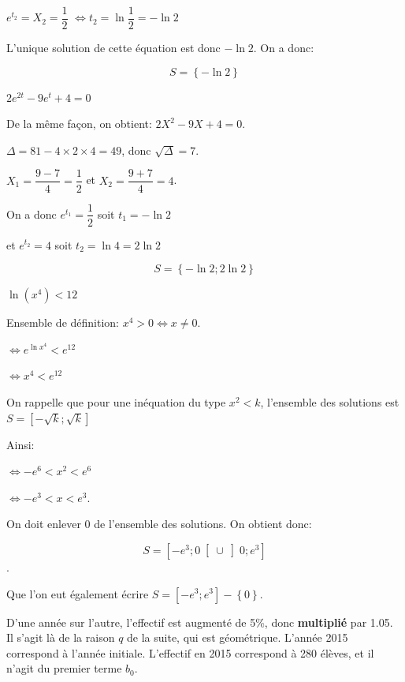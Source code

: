\documentclass[a4paper,12pt]{scrartcl}
\begin{document}

$e^{t_2} = X_2 = \dfrac{1}{2}$
$\Leftrightarrow t_2 = \ln \dfrac{1}{2} = - \ln 2$

L'unique solution  de cette équation est donc $- \ln 2$. On a donc:

$$S = \left\lbrace - \ln 2 \right\rbrace$$

\question{}
$2e^{2t} - 9e^t + 4 = 0$

De la même façon, on obtient: $2X^2 - 9X + 4 = 0$.

$\Delta = 81 - 4 \times 2 \times  4 = 49$, donc $\sqrt{\Delta} = 7$.

$X_1 = \dfrac{9 - 7}{4} = \dfrac{1}{2}$ et 
$X_2 = \dfrac{9 + 7}{4} = 4$.

On a donc $e^{t_1} = \dfrac{1}{2}$ soit $t_1 = -\ln 2$

et $e^{t_2} = 4$ soit $t_2 = \ln 4 = 2 \ln 2$

$$S = \left\lbrace -\ln 2 ; 2 \ln 2 \right\rbrace$$



\question{}
$\ln(x^4) < 12$

Ensemble de définition: $x^4 > 0 \Leftrightarrow x \neq 0$.

$\Leftrightarrow e^{\ln x^4} < e^{12}$

$\Leftrightarrow x^4 < e^{12}$

On rappelle que pour une inéquation du type $x^2 < k$, l'ensemble des solutions est $S = \left[ -\sqrt{k} ; \sqrt{k} \right]$

Ainsi:

$\Leftrightarrow -e^{6} < x^2 < e^{6}$

$\Leftrightarrow -e^{3} < x < e^{3}$.

On doit enlever 0 de l'ensemble des solutions. On obtient donc:

$$S = \left[ -e^{3} ; 0 \right[ \cup \left] 0 ; e^{3} \right]$$.

Que l'on eut également écrire $S = \left[ -e^{3} ; e^{3} \right] - \left\lbrace 0 \right\rbrace$.




D'une année sur l'autre, l'effectif est augmenté de 5\%, donc \textbf{multiplié} par 1.05. Il s'agit là de la raison $q$ de la suite, qui est géométrique. L'année 2015 correspond à l'année initiale. L'effectif en 2015 correspond à 280 élèves, et il n'agit du premier terme $b_0$. 
\end{document}
